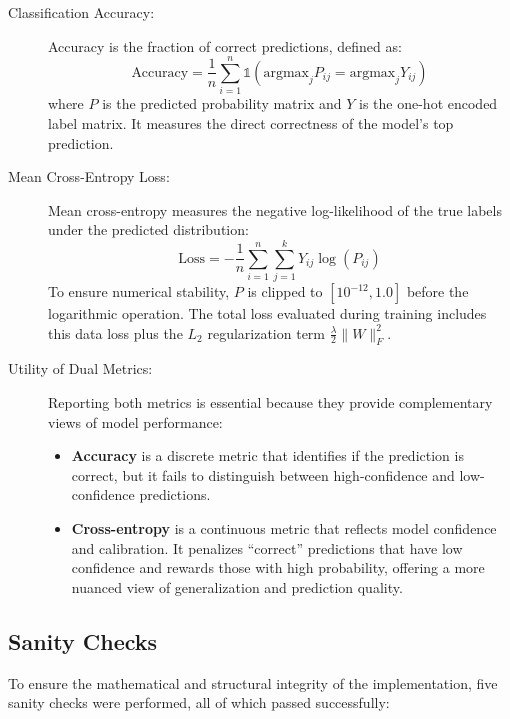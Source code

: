 \documentclass[sigconf,screen,nonacm]{acmart}
\begin{document}
\begin{description}
    \item[Classification Accuracy:] Accuracy is the fraction of correct predictions, defined as:
    \[
    \text{Accuracy} = \frac{1}{n} \sum_{i=1}^n \mathbb{1}(\text{argmax}_j P_{ij} = \text{argmax}_j Y_{ij})
    \]
    where $P$ is the predicted probability matrix and $Y$ is the one-hot encoded label matrix. It measures the direct correctness of the model's top prediction.

    \item[Mean Cross-Entropy Loss:] Mean cross-entropy measures the negative log-likelihood of the true labels under the predicted distribution:
    \[
    \text{Loss} = -\frac{1}{n} \sum_{i=1}^n \sum_{j=1}^k Y_{ij} \log(P_{ij})
    \]
    To ensure numerical stability, $P$ is clipped to $[10^{-12}, 1.0]$ before the logarithmic operation. The total loss evaluated during training includes this data loss plus the $L_2$ regularization term $\frac{\lambda}{2} \|W\|_F^2$.

    \item[Utility of Dual Metrics:] Reporting both metrics is essential because they provide complementary views of model performance:
    \begin{itemize}
        \item \textbf{Accuracy} is a discrete metric that identifies if the prediction is correct, but it fails to distinguish between high-confidence and low-confidence predictions.
        \item \textbf{Cross-entropy} is a continuous metric that reflects model confidence and calibration. It penalizes ``correct'' predictions that have low confidence and rewards those with high probability, offering a more nuanced view of generalization and prediction quality.
    \end{itemize}
\end{description}

\subsection{Sanity Checks}
To ensure the mathematical and structural integrity of the implementation, five sanity checks were performed, all of which passed successfully:
\end{document}
